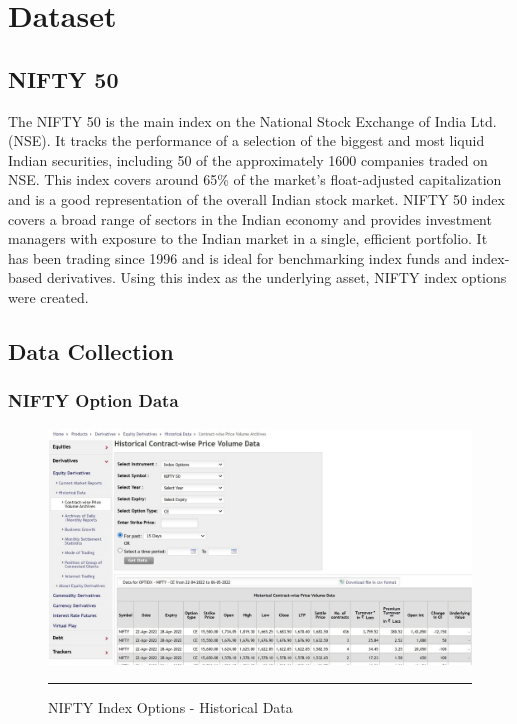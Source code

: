 
\chapter{Dataset} %

\label{Chapter4} %


\section{NIFTY 50}

The NIFTY 50 is the main index on the National Stock Exchange of India Ltd. (NSE). It tracks the performance of a selection of the biggest and most liquid Indian securities, including 50 of the approximately 1600 companies traded on NSE. This index covers around 65\% of the market's float-adjusted capitalization and is a good representation of the overall Indian stock market.
NIFTY 50 index covers a broad range of sectors in the Indian economy and provides investment managers with exposure to the Indian market in a single, efficient portfolio. It has been trading since 1996 and is ideal for benchmarking index funds and index-based derivatives. Using this index as the underlying asset, NIFTY index options were created.

\section{Data Collection}
\subsection{NIFTY Option Data}

\begin{figure}[htbp]
  \centering
    \includegraphics[scale=0.35]{Figures/data_collec_nifty_option.JPG}
    \rule{35em}{0.5pt}
  \caption[NIFTY Index Options]{NIFTY Index Options - Historical Data}
  \label{fig:data_collec_nifty_option}
\end{figure}

